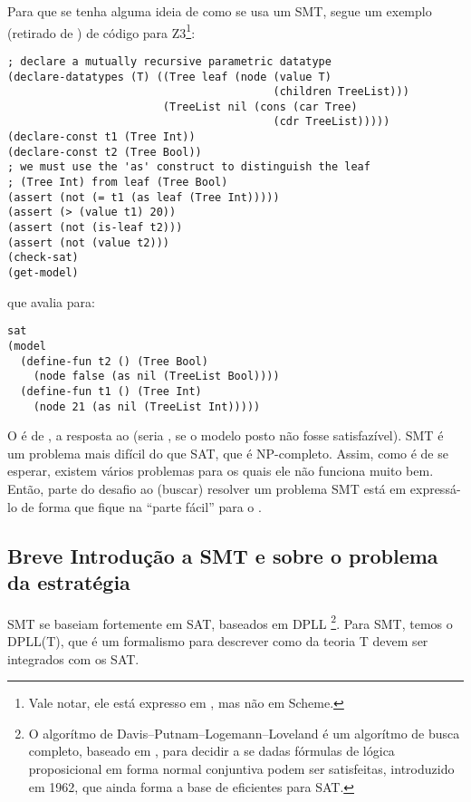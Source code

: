 \documentclass{article}
\begin{document}
Para que se tenha alguma ideia de como se usa um  SMT,
segue um exemplo (retirado de \cite{tuto}) de código para
Z3\footnote{Vale notar, ele está expresso em , mas
  não em Scheme.}:

\begin{lstlisting}
; declare a mutually recursive parametric datatype
(declare-datatypes (T) ((Tree leaf (node (value T)
                                         (children TreeList)))
                        (TreeList nil (cons (car Tree)
                                         (cdr TreeList)))))
(declare-const t1 (Tree Int))
(declare-const t2 (Tree Bool))
; we must use the 'as' construct to distinguish the leaf
; (Tree Int) from leaf (Tree Bool)
(assert (not (= t1 (as leaf (Tree Int)))))
(assert (> (value t1) 20))
(assert (not (is-leaf t2)))
(assert (not (value t2)))
(check-sat)
(get-model)
\end{lstlisting}

\noindent que avalia para:

\begin{lstlisting}
sat
(model
  (define-fun t2 () (Tree Bool)
    (node false (as nil (TreeList Bool))))
  (define-fun t1 () (Tree Int)
    (node 21 (as nil (TreeList Int)))))
\end{lstlisting}

O  é de , a resposta ao
 (seria , se o modelo posto não
fosse satisfazível). SMT é um problema mais difícil do que SAT, que é
NP-completo. Assim, como é de se esperar, existem vários problemas
para os quais ele não funciona muito bem. Então, parte do desafio ao
(buscar) resolver um problema SMT está em expressá-lo de forma que
fique na ``parte fácil'' para o .

\subsection{Breve Introdução a SMT e sobre o problema da estratégia}

 SMT se baseiam fortemente em  SAT,
baseados em DPLL \footnote{O algorítmo de
  Davis–Putnam–Logemann–Loveland é um algorítmo de busca completo,
  baseado em , para decidir a se dadas fórmulas
  de lógica proposicional em forma normal conjuntiva podem ser
  satisfeitas, introduzido em 1962, que ainda forma a base de
   eficientes para SAT.}. Para SMT, temos o DPLL(T),
que é um formalismo para descrever como  da teoria
T devem ser integrados com os  SAT.
\end{document}
